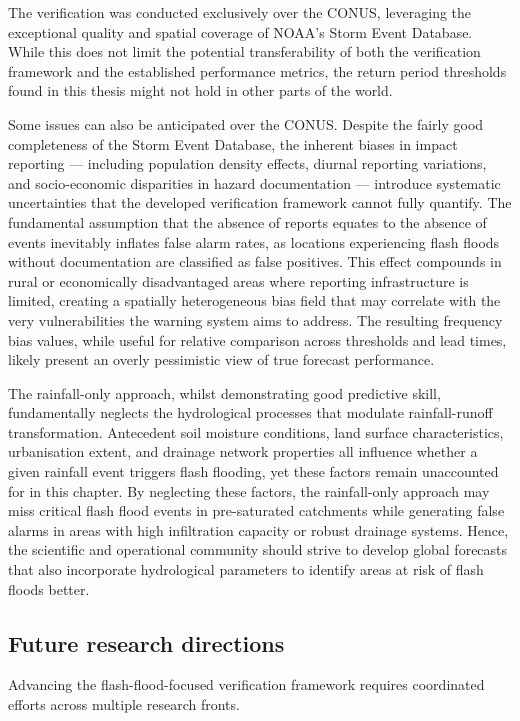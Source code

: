 The verification was conducted exclusively over the CONUS, leveraging the exceptional quality and spatial coverage of NOAA's Storm Event Database. While this does not limit the potential transferability of both the verification framework and the established performance metrics, the return period thresholds found in this thesis might not hold in other parts of the world. 

Some issues can also be anticipated over the CONUS. Despite the fairly good completeness of the Storm Event Database, the inherent biases in impact reporting — including population density effects, diurnal reporting variations, and socio-economic disparities in hazard documentation \citep{} — introduce systematic uncertainties that the developed verification framework cannot fully quantify. The fundamental assumption that the absence of reports equates to the absence of events inevitably inflates false alarm rates, as locations experiencing flash floods without documentation are classified as false positives. This effect compounds in rural or economically disadvantaged areas where reporting infrastructure is limited, creating a spatially heterogeneous bias field that may correlate with the very vulnerabilities the warning system aims to address. The resulting frequency bias values, while useful for relative comparison across thresholds and lead times, likely present an overly pessimistic view of true forecast performance.

The rainfall-only approach, whilst demonstrating good predictive skill, fundamentally neglects the hydrological processes that modulate rainfall-runoff transformation. Antecedent soil moisture conditions, land surface characteristics, urbanisation extent, and drainage network properties all influence whether a given rainfall event triggers flash flooding, yet these factors remain unaccounted for in this chapter. By neglecting these factors, the rainfall-only approach may miss critical flash flood events in pre-saturated catchments while generating false alarms in areas with high infiltration capacity or robust drainage systems. Hence, the scientific and operational community should strive to develop global forecasts that also incorporate hydrological parameters to identify areas at risk of flash floods better.

\subsection{Future research directions}

Advancing the flash-flood-focused verification framework requires coordinated efforts across multiple research fronts. 

